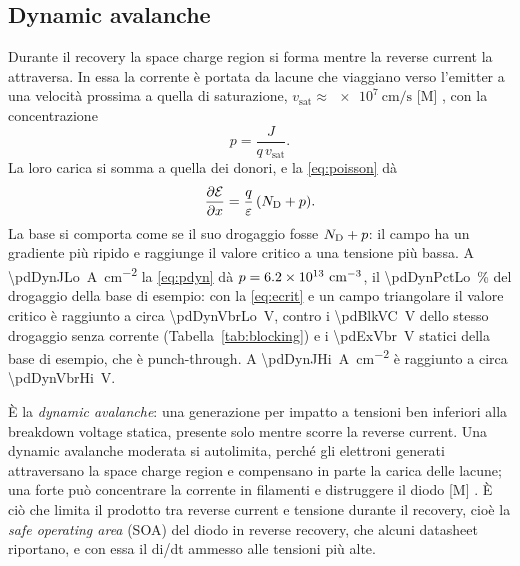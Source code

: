 \documentclass[10pt,a4paper]{scrartcl}
\let\newcommand\pdvaluedefine
\newcommand{\Ef}{\mathcal{E}}                 %
\newcommand{\ND}{N_\mathrm{D}}
\newcommand{\Pp}{p\textsuperscript{+}}
\newcommand{\cmc}{\si{\centi\metre^{-3}}}
\newcommand{\dpar}[2]{\frac{\partial #1}{\partial #2}}
\begin{document}
\subsection{Dynamic avalanche}
\label{sec:dynaval}
Durante il recovery la space charge region si forma mentre la reverse current la attraversa. In essa la corrente è portata da lacune che viaggiano verso l'emitter \Pp{} a una velocità prossima a quella di saturazione, $v_\mathrm{sat} \approx \SI{e7}{\centi\metre\per\second}$ [M] \cite{sze}, con la concentrazione
\begin{equation}
p = \frac{J}{q\,v_\mathrm{sat}} .
\label{eq:pdyn}
\end{equation}
La loro carica si somma a quella dei donori, e la \eqref{eq:poisson} dà
\begin{equation}
\dpar{\Ef}{x} = \frac{q}{\varepsilon}\,(\ND + p) .
\label{eq:dynfield}
\end{equation}
La base si comporta come se il suo drogaggio fosse $\ND + p$: il campo ha un gradiente più ripido e raggiunge il valore critico a una tensione più bassa. A \SI{\pdDynJLo}{\ampere\per\centi\metre\squared} la \eqref{eq:pdyn} dà $p = \pdDynPLo\ \cmc$, il \SI{\pdDynPctLo}{\percent} del drogaggio della base di esempio: con la \eqref{eq:ecrit} e un campo triangolare il valore critico è raggiunto a circa \SI{\pdDynVbrLo}{\volt}, contro i \SI{\pdBlkVC}{\volt} dello stesso drogaggio senza corrente (Tabella~\ref{tab:blocking}) e i \SI{\pdExVbr}{\volt} statici della base di esempio, che è punch-through. A \SI{\pdDynJHi}{\ampere\per\centi\metre\squared} è raggiunto a circa \SI{\pdDynVbrHi}{\volt}.

È la \emph{dynamic avalanche}: una generazione per impatto a tensioni ben inferiori alla breakdown voltage statica, presente solo mentre scorre la reverse current. Una dynamic avalanche moderata si autolimita, perché gli elettroni generati attraversano la space charge region e compensano in parte la carica delle lacune; una forte può concentrare la corrente in filamenti e distruggere il diodo [M] \cite{lutz}. È ciò che limita il prodotto tra reverse current e tensione durante il recovery, cioè la \emph{safe operating area} (SOA) del diodo in reverse recovery, che alcuni datasheet riportano, e con essa il di/dt ammesso alle tensioni più alte.
\end{document}
